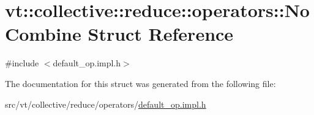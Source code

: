 \hypertarget{structvt_1_1collective_1_1reduce_1_1operators_1_1_no_combine}{}\section{vt\+:\+:collective\+:\+:reduce\+:\+:operators\+:\+:No\+Combine Struct Reference}
\label{structvt_1_1collective_1_1reduce_1_1operators_1_1_no_combine}


{\ttfamily \#include $<$default\+\_\+op.\+impl.\+h$>$}



The documentation for this struct was generated from the following file\+:\begin{DoxyCompactItemize}
\item 
src/vt/collective/reduce/operators/\hyperlink{default__op_8impl_8h}{default\+\_\+op.\+impl.\+h}\end{DoxyCompactItemize}
